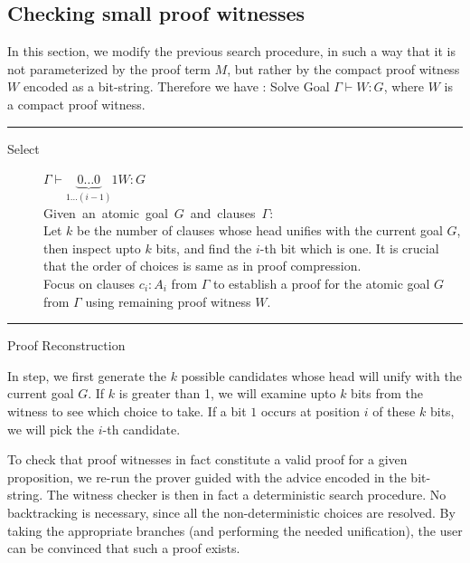 \documentclass{acmconf}
\newcommand{\figfoot}{\vspace{1ex}\hrule}
\newcommand{\fighead}{\hrule\vspace{1.5ex}}
\newcommand{\vd}{\vdash}
\begin{document}
\subsection{Checking small proof witnesses}
In this section, we modify the previous search procedure, in such a
way that it is not parameterized by the proof term $M$, but rather by
the compact proof witness $W$ encoded as a bit-string. Therefore we
have : Solve Goal $\Gamma \vd W : G$, where $W$ is a compact proof witness.  

\begin{table}[h]
\fighead
\begin{center}
\begin{small}
\begin{description}
\item[Select] $\Gamma \vd \underset{1 \ldots
    (i-1)}{\underbrace{0\ldots 0}}1
W : G $ \\
    \mbox{Given an atomic goal $G$ and clauses $\Gamma$:}\hfill\\
    Let $k$ be the number of clauses whose head unifies with the
    current goal $G$, then inspect upto $k$ bits, and
    find the $i$-th bit which is one. It is crucial that the order 
    of choices is same as in proof compression.\\  
    Focus on clauses $c_i : A_i$ from $\Gamma$ to establish a proof
    for the atomic goal $G$ from $\Gamma$ using remaining proof witness $W$.
\end{description}
\end{small}    
\end{center}
\figfoot
\caption{\label{fig:pwrecon} Proof Reconstruction}
\end{table}

In {} step, we first generate the $k$ possible candidates
whose head will unify with the current goal $G$. If $k$ is greater
than 1, we will examine upto $k$ bits from the witness to see which
choice to take. If a bit $1$ occurs at position $i$ of these $k$
bits, we will pick the $i$-th candidate.

To check that proof witnesses in fact constitute a valid proof for a
given proposition, we re-run the prover guided with the advice encoded
in the bit-string. The witness checker is then in fact a deterministic
search procedure. No backtracking is necessary, since all the
non-deterministic choices are resolved.  By taking the appropriate
branches (and performing the needed unification), the user can be
convinced that such a proof exists. 
\end{document}

